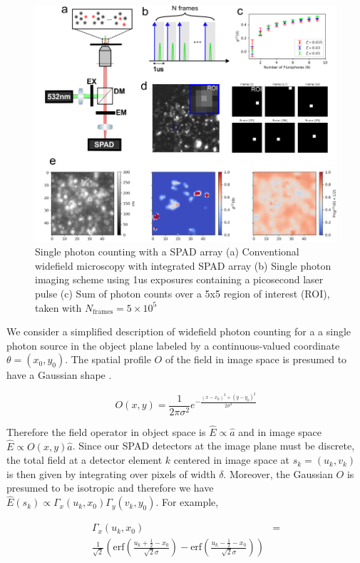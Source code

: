 \documentclass[a4paper, twocolumn, superscriptaddress,prl]{revtex4}  %
\begin{document}
\begin{figure}
\includegraphics[width=14cm]{Figure-0.png}
\caption{Single photon counting with a SPAD array (a) Conventional widefield microscopy with integrated SPAD array (b) Single photon imaging scheme using 1us exposures containing a picosecond laser pulse (c) Sum of photon counts over a 5x5 region of interest (ROI), taken with $N_{\mathrm{frames}}=5\times 10^{5}$}
\end{figure}    

We consider a simplified description of widefield photon counting for a a single photon source in the object plane labeled by a continuous-valued coordinate $\theta=(x_0,y_0)$. The spatial profile $O$ of the field in image space is presumed to have a Gaussian shape \citep{Zhang2007,Richards1959,Gibson1989}.

\begin{equation}
O(x,y) = \frac{1}{2\pi\sigma^{2}}e^{-\frac{(x-x_{0})^2+(y-y_{0})^2}{2\sigma^2}}
\end{equation}

Therefore the field operator in object space is $\hat{E} \propto \hat{a}$ and in image space $\hat{E} \propto O(x,y)\hat{a}$. Since our SPAD detectors at the image plane must be discrete, the total field at a detector element $k$ centered in image space at $s_k=(u_k,v_k)$ is then given by integrating over pixels of width $\delta$. Moreover, the Gaussian $O$ is presumed to be isotropic and therefore we have $\hat{E}(s_k) \propto \Gamma_{x}(u_k,x_{0})\Gamma_{y}(v_k,y_0)$. For example,

\begin{align*}
\Gamma_{x}(u_k,x_{0}) &= \\ \frac{1}{\sqrt{2}}\left(\mathrm{erf}\left(\frac{u_k+\frac{1}{2}-x_{0}}{\sqrt{2}\sigma}\right) -\mathrm{erf}\left(\frac{u_k-\frac{1}{2}-x_0}{\sqrt{2}\sigma}\right)\right)
\end{align*}
\end{document}
